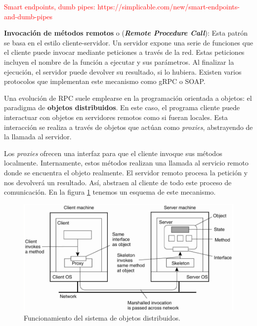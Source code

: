 \textcolor{red}{Smart endpoints, dumb pipes: https://simplicable.com/new/smart-endpoints-and-dumb-pipes}

\textbf{Invocación de métodos remotos} o (\emph{\textbf{Remote Procedure Call}}): Esta patrón se basa en el estilo cliente-servidor. Un servidor expone una serie de funciones que el cliente puede invocar mediante peticiones a través de la red. Estas peticiones incluyen el nombre de la función a ejecutar y sus parámetros. Al finalizar la ejecución, el servidor puede devolver su resultado, si lo hubiera. Existen varios protocolos que implementan este mecanismo como gRPC o SOAP.

Una evolución de RPC suele emplearse en la programación orientada a objetos: el paradigma de \textbf{objetos distribuidos}. \cite{tanenbaumChapter10Distributed2007} En este caso, el programa cliente puede interactuar con objetos en servidores remotos como si fueran locales. Esta interacción se realiza a través de objetos que actúan como \emph{proxies}, abstrayendo de la llamada al servidor.

Los \emph{proxies} ofrecen una interfaz para que el cliente invoque sus métodos localmente. Internamente, estos métodos realizan una llamada al servicio remoto donde se encuentra el objeto realmente. El servidor remoto procesa la petición y nos devolverá un resultado. Así, abstraen al cliente de todo este proceso de comunicación. En la figura \ref{fig:rpc-distributedobjects} tenemos un esquema de este mecanismo.

\begin{figure}[htb]
  \centering
  \includegraphics[scale=1.5]{cap_arquitectura/images/rpc-distributedobjects}
  \caption[Funcionamiento del sistema de objetos distribuidos]{Funcionamiento del sistema de objetos distribuidos. \cite{tanenbaumChapter10Distributed2007}}
  \label{fig:rpc-distributedobjects}
\end{figure}

